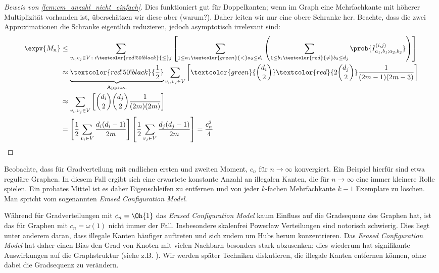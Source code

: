 \begin{proof}[Beweis von \cref{lem:cm_anzahl_nicht_einfach}]
    Dies funktioniert gut für Doppelkanten; wenn im Graph eine Mehrfachkante mit höherer Multiplizität vorhanden ist, überschätzen wir diese aber (warum?).
    Daher leiten wir nur eine obere Schranke her.
    Beachte, dass die zwei Approximationen die Schranke eigentlich reduzieren, jedoch asymptotisch irrelevant sind:
    \begin{align}
        \expv{M_n}
         & \le \sum_{v_i, v_j \in V\colon i \textcolor{red!50!black}{\le} j} \left[ \sum_{1 \le a_1 \textcolor{green}{<} a_2 \le d_i} \left( \sum_{1 \le b_1 \textcolor{red}{\ne} b_2 \le d_j} \prob{I^{(i,j)}_{a_1,b_1;a_2,b_2}} \right) \right] \\
         & \approx \underbrace{\textcolor{red!50!black}{\frac 1 2}}_\text{Approx.} \sum_{v_i, v_j \in V} \left[ \textcolor{green}{\binom{d_i}{2}} \textcolor{red}{2\binom{d_j}{2}} \frac{1}{(2m - 1)(2m - 3)}   \right]                           \\
         & \approx \sum_{v_i, v_j \in V} \left[ \binom{d_i}{2} \binom{d_j}{2} \frac{1}{(2m)(2m)}   \right]                                                                                                                                        \\
         & = \left[ \frac{1}{2} \sum_{v_i \in V} \frac{d_i (d_i - 1)}{2m}  \right] \left[ \frac{1}{2} \sum_{v_j \in V} \frac{d_j (d_j - 1)}{2m} \right]
        = \frac{c_n^2}{4} \qedhere
    \end{align}
\end{proof}

Beobachte,  dass für Gradverteilung mit endlichen ersten und zweiten Moment, $c_n$ für $n \to \infty$ konvergiert.
Ein Beispiel hierfür sind etwa reguläre Graphen.
In diesem Fall ergibt sich eine erwartete konstante Anzahl an illegalen Kanten, die für $n \to \infty$ eine immer kleinere Rolle spielen.
Ein probates Mittel ist es daher Eigenschleifen zu entfernen und von jeder $k$-fachen Mehrfachkante $k{-}1$ Exemplare zu löschen.
Man spricht vom sogenannten \emph{Erased Configuration Model}.

Während für Gradverteilungen mit $c_n = \Oh{1}$ das \emph{Erased Configuration Model} kaum Einfluss auf die Gradsequenz des Graphen hat, ist das für Graphen mit $c_n = \omega(1)$ nicht immer der Fall.
Insbesondere skalenfrei Powerlaw Verteilungen sind notorisch schwierig.
Dies liegt unter anderem daran, dass illegale Kanten häufiger auftreten und sich zudem um Hubs herum konzentrieren.
Das \emph{Erased Configuration Model} hat daher einen Bias den Grad von Knoten mit vielen Nachbarn besonders stark abzusenken;
dies wiederum hat signifikante Auswirkungen auf die Graphstruktur (siehe z.B. \cite{DBLP:journals/snam/SchlauchHZ15}).
Wir werden später Techniken diskutieren, die illegale Kanten entfernen können, ohne dabei die Gradsequenz zu verändern.

